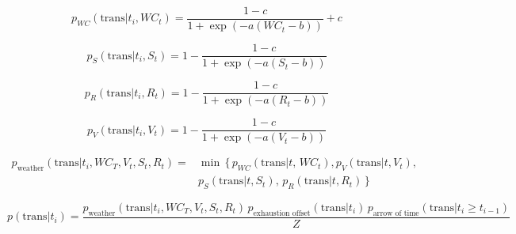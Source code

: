 \documentclass[11pt, letterpaper]{article}
\begin{document}
\begin{equation}
p_{WC}(\text{trans} | t_i, WC_t) = \frac{1 - c}{1 + \exp(-a (WC_t - b))} + c
\end{equation}

\begin{equation}
p_S(\text{trans} | t_i, S_t) = 1 - \frac{1 - c}{1 + \exp(-a (S_t - b))}
\end{equation}

\begin{equation}
p_R(\text{trans} | t_i, R_t) = 1 - \frac{1 - c}{1 + \exp(-a (R_t - b))}
\end{equation}

\begin{equation}
p_V(\text{trans} | t_i, V_t) = 1 - \frac{1 - c}{1 + \exp(-a (V_t - b))}
\end{equation}

\begin{align}
p_{\text{weather}}(\text{trans} | t_i, WC_T, V_t, S_t, R_t) = &\min \, \{ \, p_{WC}(\text{trans} | t, \, WC_t), p_V(\text{trans} | t, V_t), \\ 
&p_S(\text{trans} | t, S_t), \, p_R(\text{trans} | t, R_t) \, \} \nonumber
\end{align}

\begin{equation}
p(\text{trans} | t_i) = \frac{p_{\text{weather}}(\text{trans} | t_i, WC_T, V_t, S_t, R_t) \, p_{\text{exhaustion offset}}(\text{trans} | t_i) \, p_{\text{arrow of time}}(\text{trans} | t_i \geq t_{i-1})}{Z}
\end{equation}
\end{document}
